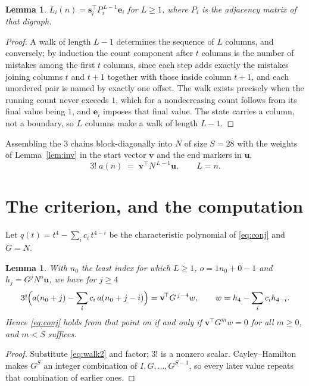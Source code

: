 \documentclass[11pt,a4paper]{article}
\theoremstyle{plain}
\newtheorem{lemma}[theorem]{Lemma}
\theoremstyle{definition}
\begin{document}
\begin{lemma}\label{lem:walk}
$L_i(n)=\mathbf{s}_i^{\!\top}P_i^{\,L-1}\mathbf{e}_i$ for $L\ge1$, where $P_i$ is the
adjacency matrix of that digraph.
\end{lemma}

\begin{proof}
A walk of length $L-1$ determines the sequence of $L$ columns, and conversely; by induction
the count component after $t$ columns is the number of mistakes among the first $t$ columns,
since each step adds exactly the mistakes joining columns $t$ and $t+1$ together with those
inside column $t+1$, and each unordered pair is named by exactly one offset. The walk exists
precisely when the running count never exceeds $1$, which for a nondecreasing count follows
from its final value being $1$, and $\mathbf{e}_i$ imposes that final value. The state
carries a column, not a boundary, so $L$ columns make a walk of length $L-1$.
\end{proof}

Assembling the $3$ chains block-diagonally into $N$ of size $S=28$ with the weights of
Lemma~\ref{lem:inv} in the start vector $\mathbf{v}$ and the end markers in
$\mathbf{u}$,
\begin{equation}\label{eq:walk2}
3!\;a(n)\;=\;\mathbf{v}^{\!\top}N^{\,L-1}\mathbf{u},\qquad L=n .
\end{equation}

\section{The criterion, and the computation}

Let $q(t)=t^{4}-\sum_i c_i\,t^{4-i}$ be the characteristic polynomial of
\eqref{eq:conj} and $G=N$.

\begin{lemma}\label{lem:crit}
With $n_0$ the least index for which $L\ge1$, $o=1n_0+0-1$ and
$h_j=G^{j}N^{o}\mathbf{u}$, we have for $j\ge4$
\[
3!\Bigl(a(n_0+j)-\sum_i c_i\,a(n_0+j-i)\Bigr)=\mathbf{v}^{\!\top}G^{\,j-4}w,
\qquad w=h_{4}-\sum_i c_ih_{4-i} .
\]
Hence \eqref{eq:conj} holds from that point on if and only if
$\mathbf{v}^{\!\top}G^{m}w=0$ for all $m\ge0$, and $m<S$ suffices.
\end{lemma}

\begin{proof}
Substitute \eqref{eq:walk2} and factor; $3!$ is a nonzero scalar. Cayley--Hamilton
makes $G^{S}$ an integer combination of $I,G,\dots,G^{S-1}$, so every later value repeats
that combination of earlier ones.
\end{proof}
\end{document}
